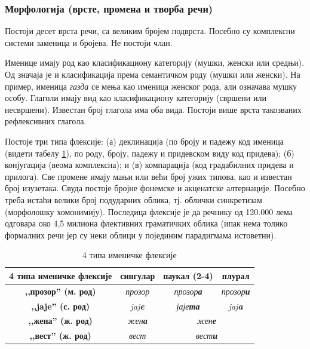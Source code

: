 \begin{multicols}{2}
\subsubsection {Морфологија (врсте, промена и творба речи)}
  
Постоји десет врста речи, са великим бројем подврста. Посебно су комплексни системи заменица и бројева. Не постоји члан. 

Именице имају род као класификациону категорију (мушки, женски или средњи). Од значаја је и класификација према семантичком роду (мушки или женски). На пример, именица \textit{газда} се мења као именица женског рода, али означава мушку особу. Глаголи имају вид као класификациону категорију (свршени или  несвршени). Известан број глагола има оба вида. Постоји више врста такозваних рефлексивних глагола. 

Постоје три типа флексије: (а) деклинација (по броју и падежу код именица (видети табелу \ref{imenicke_fleksije}), по роду, броју, падежу и придевском виду код придева); (б) конјугација (веома комплексна); и (в) компарација (код градабилних придева и прилога).  Све промене имају мањи или већи број ужих типова, као и известан број изузетака. Свуда постоје бројне фонемске и акценатске алтернације. Посебно треба истаћи велики број подударних облика, тј. облички синкретизам (морфолошку хомонимију). Последица флексије је да речнику од 120.000 лема одговара око 4,5 милиона флективних граматичких облика (ипак нема толико формалних речи јер су неки облици у појединим парадигмама истоветни). 

\begin{table}[ht]
\begin{center}
\begin{tabular}{|c|c|c|c|}
\hline
{\textbf{4 типа именичке флексије}} & {\textbf{сингулар}} & {\textbf{паукал (2-4)}} & {\textbf{плурал}} \\
\hline
{\textbf{,,прозор'' (м. род)}} & \textit{прозор} & \textit{прозор\textbf{а}} & \textit{прозор\textbf{и}} \\
\hline
{\textbf{,,jaje'' (с. род)}} & \textit{jaj\textbf{e}} & \textit{јаје\textbf{та}} & \textit{jaj\textbf{a}} \\
\hline
{\textbf{,,жена'' (ж. род)}} & \textit{жен\textbf{а}} & \multicolumn{2}{c|}{\textit{жен\textbf{е}}} \\
\hline
{\textbf{,,вест'' (ж. род)}} & \textit{вест} &  \multicolumn{2}{c|}{\textit{вест\textbf{и}}} \\
\hline
\end{tabular}
\end{center}
\caption{4 типа именичке флексије}
\label{imenicke_fleksije}
\end{table}



\end{multicols}
